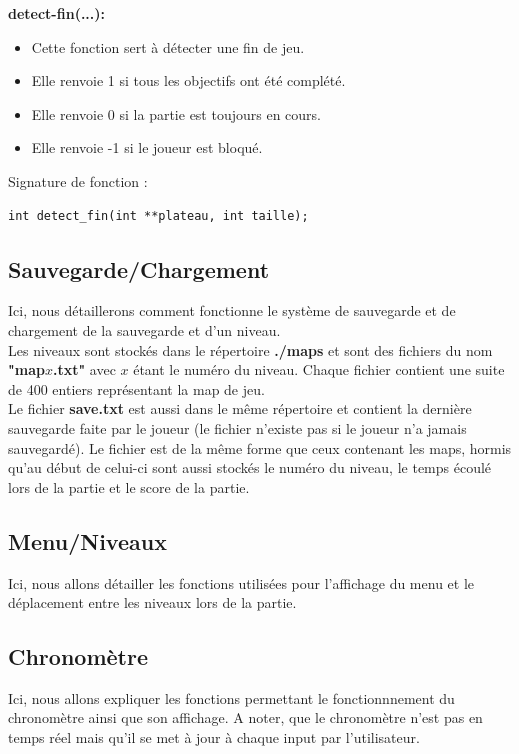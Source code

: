 \documentclass{article}
\begin{document}
\textbf{detect-fin(...):}
\begin{itemize}
\item Cette fonction sert à détecter une fin de jeu.
\item Elle renvoie 1 si tous les objectifs ont été complété.
\item Elle renvoie 0 si la partie est toujours en cours.
\item Elle renvoie -1 si le joueur est bloqué.
\end{itemize}
Signature de fonction :
\begin{lstlisting}
int detect_fin(int **plateau, int taille);
\end{lstlisting}


\newpage

\subsection{Sauvegarde/Chargement}
Ici, nous détaillerons comment fonctionne le système de sauvegarde et de chargement de la sauvegarde et d'un niveau.\\
Les niveaux sont stockés dans le répertoire \textbf{./maps} et sont des fichiers du nom \textbf{"map$x$.txt"} avec $x$ étant le numéro du niveau. Chaque fichier contient une suite de 400 entiers représentant la map de jeu.\\
Le fichier \textbf{save.txt} est aussi dans le même répertoire et contient la dernière sauvegarde faite par le joueur (le fichier n'existe pas si le joueur n'a jamais sauvegardé). Le fichier est de la même forme que ceux contenant les maps, hormis qu'au début de celui-ci sont aussi stockés le numéro du niveau, le temps écoulé lors de la partie et le score de la partie.\\
\newpage

\subsection{Menu/Niveaux}
Ici, nous allons détailler les fonctions utilisées pour l'affichage du menu et le déplacement entre les niveaux lors de la partie.
\newpage

\subsection{Chronomètre}
Ici, nous allons expliquer les fonctions permettant le fonctionnnement du chronomètre ainsi que son affichage.
A noter, que le chronomètre n'est pas en temps réel mais qu'il se met à jour à chaque input par l'utilisateur.
\newpage
\end{document}
